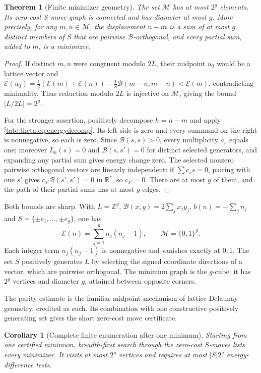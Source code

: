\documentclass[11pt,letterpaper]{article}
\newtheorem{theorem}{Theorem}[section]
\newtheorem{corollary}[corollary]{Corollary}
\theoremstyle{definition}
\newcommand{\R}{\mathbb R}
\newcommand{\Z}{\mathbb Z}
\newcommand{\cB}{\mathcal B}
\newcommand{\cE}{\mathcal E}
\newcommand{\cM}{\mathcal M}
\begin{document}
\begin{theorem}[Finite minimizer geometry]\label{tate:theta:thm:minimizers}
The set $\cM$ has at most $2^g$ elements. Its zero-cost $S$-move graph is
connected and has diameter at most $g$. More precisely, for any
$m,n\in\cM$, the displacement $n-m$ is a sum of at most $g$ distinct members
of $S$ that are pairwise $\cB$-orthogonal, and every partial sum, added to
$m$, is a minimizer.
\end{theorem}

\begin{proof}
If distinct $m,n$ were congruent modulo $2L$, their midpoint $u_0$ would be
a lattice vector and
$\cE(u_0)=\tfrac12(\cE(m)+\cE(n))-\tfrac18\cB(m-n,m-n)<\cE(m)$,
contradicting minimality. Thus reduction modulo $2L$ is injective on $\cM$,
giving the bound $|L/2L|=2^g$.

For the stronger assertion, positively decompose $h=n-m$ and apply
\eqref{tate:theta:eq:energydecomp}. Its left side is zero and every summand
on the right is nonnegative, so each is zero. Since $\cB(s,s)>0$, every
multiplicity $a_s$ equals one; moreover $I_m(s)=0$ and $\cB(s,s')=0$ for
distinct selected generators, and expanding any partial sum gives energy
change zero. The selected nonzero pairwise orthogonal vectors are linearly
independent: if $\sum c_ss=0$, pairing with one $s'$ gives
$c_{s'}\cB(s',s')=0$ in $\R^r$, so $c_{s'}=0$. There are at most $g$ of
them, and the path of their partial sums has at most $g$ edges.
\end{proof}

Both bounds are sharp. With $L=\Z^g$,
$\cB(x,y)=2\sum_jx_jy_j$, $b(n)=-\sum_jn_j$ and
$S=\{\pm e_1,\ldots,\pm e_g\}$, one has
\[
 \cE(n)=\sum_{j=1}^g n_j(n_j-1),\qquad \cM=\{0,1\}^g.
\]
Each integer term $n_j(n_j-1)$ is nonnegative and vanishes exactly at
$0,1$. The set $S$ positively generates $L$ by selecting the signed
coordinate directions of a vector, which are pairwise orthogonal.
The minimum graph is the $g$-cube: it has $2^g$ vertices and diameter
$g$, attained between opposite corners.

The parity estimate is the familiar midpoint mechanism of lattice Delaunay
geometry, credited as such. Its combination with one constructive
positively generating set gives the short zero-cost move certificate.

\begin{corollary}[Complete finite enumeration after one minimum]\label{tate:theta:cor:BFS}
Starting from one certified minimum, breadth-first search through the
zero-cost $S$-moves lists every minimizer. It visits at most $2^g$ vertices
and requires at most $|S|2^g$ energy-difference tests.
\end{corollary}
\end{document}
